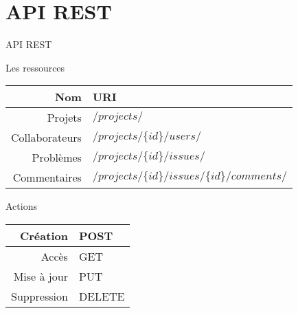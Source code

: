 \section{API REST}

\begin{frame}{API REST}
  \begin{block}{Les ressources}
    \begin{center}
      \begin{tabular}{|r|l|}
        \hline
        Nom & URI \\
        \hline
        \hline
        Projets & $/projects/$ \\
        Collaborateurs & $/projects/\{id\}/users/$ \\
        Problèmes & $/projects/\{id\}/issues/$ \\
        Commentaires & $/projects/\{id\}/issues/\{id\}/comments/$ \\
        \hline
      \end{tabular}
    \end{center}
  \end{block}

  \begin{block}{Actions}
    \begin{center}
      \begin{tabular}{|r|l|}
        \hline
        Création & POST \\
        \hline
        Accès & GET \\
        \hline
        Mise à jour & PUT \\
        \hline
        Suppression & DELETE \\
        \hline
      \end{tabular}
    \end{center}
  \end{block}
\end{frame}

